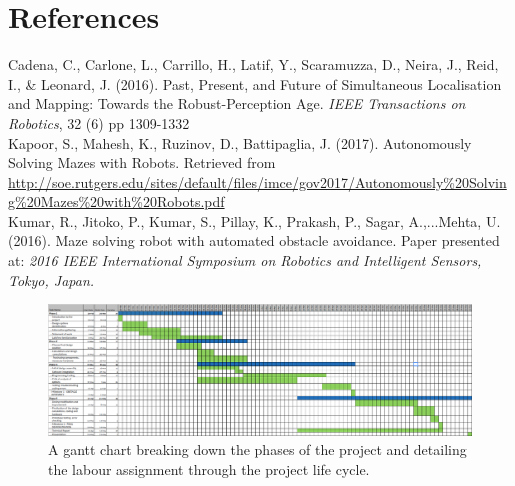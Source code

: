 \documentclass[a4paper]{article}
\begin{document}
\newpage

\section{References}
Cadena, C., Carlone, L., Carrillo, H., Latif, Y., Scaramuzza, D., Neira, J., Reid, I., \& Leonard, J. (2016). Past, Present, and Future of Simultaneous Localisation and Mapping: Towards the Robust-Perception Age. \textit{IEEE Transactions on Robotics}, 32 (6) pp 1309-1332\\

Kapoor, S., Mahesh, K., Ruzinov, D., Battipaglia, J. (2017). Autonomously Solving Mazes with Robots. Retrieved from \small\url{http://soe.rutgers.edu/sites/default/files/imce/gov2017/Autonomously%20Solving%20Mazes%20with%20Robots.pdf}\\

Kumar, R., Jitoko, P., Kumar, S., Pillay, K., Prakash, P., Sagar, A.,...Mehta, U. (2016). Maze solving robot with automated obstacle avoidance. Paper presented at: \textit{2016 IEEE International Symposium on Robotics and Intelligent Sensors, Tokyo, Japan.}\\




\begin{figure}
\centering
\includegraphics[scale=0.38]{gantt}
\caption{A gantt chart breaking down the phases of the project and detailing the labour assignment through the project life cycle.}
\end{figure}
\end{document}
